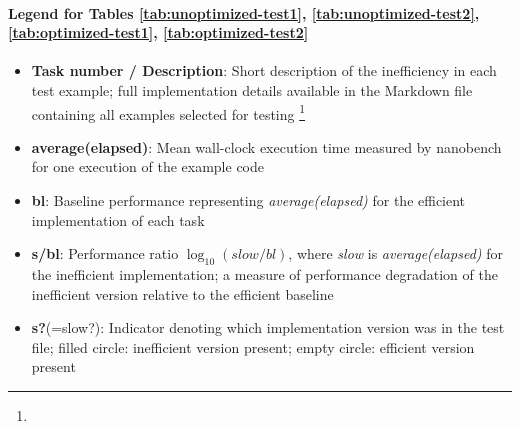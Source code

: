 \paragraph{Legend for Tables 
\ref{tab:unoptimized-test1},
\ref{tab:unoptimized-test2},
\ref{tab:optimized-test1},
\ref{tab:optimized-test2}%
}
\begin{itemize}
  \item \textbf{Task number / Description}: Short description of the inefficiency in each test example; full implementation details available in the Markdown file containing all examples selected for testing%
        \footnote{}

  \item \textbf{average(elapsed)}: Mean wall-clock execution time measured by nanobench for one execution of the example code

  \item \textbf{bl}: Baseline performance representing \emph{average(elapsed)} for the efficient implementation of each task

  \item \textbf{s/bl}: Performance ratio $\log_{10}(slow / bl)$, where \emph{slow} is \emph{average(elapsed)} for the inefficient implementation; a measure of performance degradation of the inefficient version relative to the efficient baseline

  \item \textbf{s?}(=slow?):  Indicator denoting which implementation version was in the test file; filled circle: inefficient version present; empty circle: efficient version present


\end{itemize}
